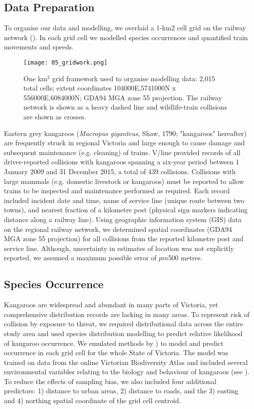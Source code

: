 \subsection{Data Preparation}

To organise our data and modelling, we overlaid a 1-km2 cell grid on the railway network ().  In each grid cell we modelled species occurrences and quantified train movements and speeds.

\begin{figure*}[htp]
  \centering
  \texttt{[image: 05\_gridwork.png]}
  \caption[]{One km$^2$ grid framework used to organise modelling data: 2,015 total cells; extent coordinates 104000E,5741000N x 556000E,6084000N; GDA94 MGA zone 55 projection. The railway network is shown as a heavy dashed line and wildlife-train collisions are shown as crosses.}
  \label{trains_grid}
\end{figure*}

Eastern grey kangaroos (\textit{Macropus giganteus}, Shaw, 1790; "kangaroos" hereafter) are frequently struck in regional Victoria and large enough to cause damage and subsequent maintenance (e.g. cleaning) of trains.  V/line provided records of all driver-reported collisions with kangaroos spanning a six-year period between 1 January 2009 and 31 December 2015, a total of 439 collisions. Collisions with large mammals (e.g. domestic livestock or kangaroos) must be reported to allow trains to be inspected and maintenance performed as required. Each record included incident date and time, name of service line (unique route between two towns), and nearest fraction of a kilometre post (physical sign markers indicating distance along a railway line).  Using geographic information system (GIS) data on the regional railway network, we determined spatial coordinates (GDA94 MGA zone 55 projection) for all collisions from the reported kilometre post and service line. Although, uncertainty in estimates of location was not explicitly reported, we assumed a maximum possible error of $pm$500 metres.

\subsection{Species Occurrence}

Kangaroos are widespread \citep{daws12} and abundant in many parts of Victoria, yet comprehensive distribution records are lacking in many areas. To represent risk of collision by exposure to threat, we required distributional data across the entire study area and used species distribution modelling to predict relative likelihood of kangaroo occurrence.  We emulated methods by \cite{elit08}) to model and predict occurrence in each grid cell for the whole State of Victoria. The model was trained on data from the online Victorian Biodiversity Atlas \citep{depi16} and included several environmental variables relating to the biology and behaviour of kangaroos (see ).  To reduce the effects of sampling bias, we also included four additional predictors:  1) distance to urban areas, 2) distance to roads, and the 3) easting and 4) northing spatial coordinate of the grid cell centroid.

